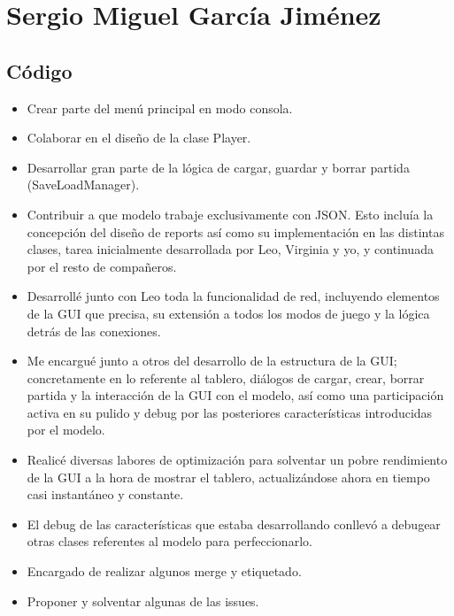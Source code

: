 \documentclass[../FINAL/Scrum/SCRUM.tex]{subfiles}
\begin{document}
\section{Sergio Miguel García Jiménez}
\subsection*{Código}

\begin{itemize}
\item Crear parte del menú principal en modo consola.
\item Colaborar en el diseño de la clase Player.
\item Desarrollar gran parte de la lógica de cargar, guardar y borrar partida (SaveLoadManager).
\item Contribuir a que modelo trabaje exclusivamente con JSON. Esto incluía la concepción del diseño de reports así como su implementación en las distintas clases, tarea inicialmente desarrollada por Leo, Virginia y yo, y continuada por el resto de compañeros.
\item Desarrollé junto con Leo toda la funcionalidad de red, incluyendo elementos de la GUI que precisa, su extensión a todos los modos de juego y la lógica detrás de las conexiones.
\item Me encargué junto a otros del desarrollo de la estructura de la GUI; concretamente en lo referente al tablero, diálogos de cargar, crear, borrar partida y la interacción de la GUI con el modelo, así como una participación activa en su pulido y debug por las posteriores características introducidas por el modelo.
\item Realicé diversas labores de optimización para solventar un pobre rendimiento de la GUI a la hora de mostrar el tablero, actualizándose ahora en tiempo casi instantáneo y constante.
\item El debug de las características que estaba desarrollando conllevó a debugear otras clases referentes al modelo para perfeccionarlo.
\item Encargado de realizar algunos merge y etiquetado.
\item Proponer y solventar algunas de las issues.
\end{itemize}
\end{document}
